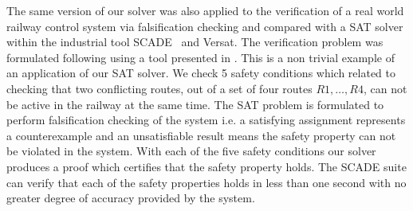 %
The same version of our solver was also applied to the verification of a real world railway control system via falsification checking and compared with a SAT solver within the industrial tool SCADE~\cite{SCADE} and Versat. The verification problem was formulated following \cite{MS00} using a tool presented in \cite{KK08}. This is a non trivial example of an application of our SAT solver. We check 5 safety conditions which related to checking that two conflicting routes, out of a set of four routes $R1, \ldots, R4$, can not be active in the railway at the same time. The SAT problem is formulated to perform falsification checking of the system i.e. a satisfying assignment represents a counterexample and an unsatisfiable result means the safety property can not be violated in the system. With each of the five safety conditions our solver produces a proof which certifies that the safety property holds. The SCADE suite can verify that each of the safety properties holds in less than one second with no greater degree of accuracy provided by the system.

